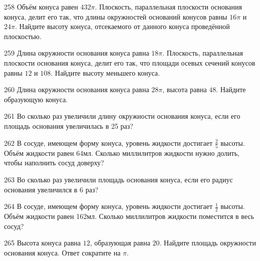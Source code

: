 \documentclass[a4paper]{article}
\begin{document}
\begin{taskBN}{258}
Объём конуса равен $432\pi$. Плоскость, параллельная плоскости основания конуса,  делит его так, что длины окружностей оснований конусов равны $16\pi$ и $24\pi$. Найдите высоту конуса, отсекаемого от данного конуса проведённой плоскостью. 
\end{taskBN}

\begin{taskBN}{259}
Длина окружности основания конуса равна $18\pi$. Плоскость, параллельная плоскости основания конуса,  делит его так, что площади осевых сечений конусов равны $12$ и $108$. Найдите высоту меньшего конуса. 
\end{taskBN}

\begin{taskBN}{260}
Длина окружности основания конуса равна $28\pi$, высота равна $48$. Найдите образующую конуса. 
\end{taskBN}

\begin{taskBN}{261}
Во сколько раз увеличили длину окружности основания конуса, если его площадь основания увеличилась в 25 раз?
\end{taskBN}

\begin{taskBN}{262}
В сосуде, имеющем форму конуса, уровень жидкости достигает $\frac{2}{5}$ высоты. Объём жидкости равен 64мл. Сколько миллилитров жидкости нужно долить, чтобы наполнить сосуд доверху?
\end{taskBN}

\begin{taskBN}{263}
Во сколько раз увеличили площадь основания конуса, если его радиус основания увеличился в 6 раз?
\end{taskBN}

\begin{taskBN}{264}
В сосуде, имеющем форму конуса, уровень жидкости достигает $\frac{1}{2}$ высоты. Объём жидкости равен 162мл. Сколько миллилитров жидкости поместится в весь сосуд?
\end{taskBN}

\begin{taskBN}{265}
Высота конуса равна $12$, образующая равна $20$. Найдите площадь окружности основания конуса. Ответ сократите на $\pi$.
\end{taskBN}
\end{document}
